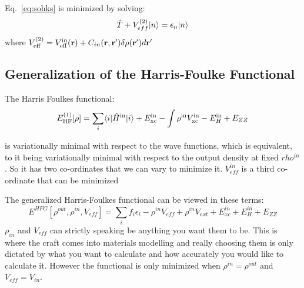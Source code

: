 Eq.~\ref{eq:sohks} is minimized by solving:
%
\begin{equation}
\hat{T} + V_{eff}^{(2)}|n\rangle= \epsilon_{n}|n\rangle
\end{equation}
%
where $V_{\rm eff}^{(2)}=V^{\rm in}_{\rm eff}({\bf r}) + C_{in}({\bf r},{\bf r}')\delta \rho({\bf r}')d{\bf r}'$

%

\subsection{Generalization of the Harris-Foulke Functional}

The Harris Foulkes functional:
%
\begin{equation}
E^{(1)}_{\rm HF}[\rho] = \sum_{i} \langle i |\hat{H}^{\rm in}|i\rangle + E_{\rm xc}^{\rm in} - \int \rho^{\rm in}V^{\rm in}_{\rm xc} - E^{\rm in}_{H} + E_{ZZ}
\end{equation}

is variationally minimal with respect to the wave functions, which is equivalent, 
to it being variationally minimal
with respect to the output density at fixed $rho^{in}$. So it has 
two co-ordinates that we can vary to minimize it. 
$V^{in}_{eff}$ is a third co-ordinate that can be minimized

The generalized Harris-Foulkes functional can be viewed in these terms:
%
\begin{equation}
E^{HFG}[\rho^{out}, \rho^{in}, V_{eff}] = \sum_{i}f_{i}\epsilon_{i}-\rho^{in}V_{eff}+\rho^{in}V_{ext}+E_{xc}^{in}+E_{H}^{in}+E_{ZZ}
\end{equation}
%
$\rho_{in}$ and $V_{eff}$ can strictly speaking be anything you want them to be. 
This is where the craft comes into materials modelling and really 
choosing them is only dictated by what you
want to calculate and how accurately you would like to calculate it. 
However the functional is only minimized when $\rho^{in} = \rho^{out}$ and $V_{eff}=V_{in}$.

